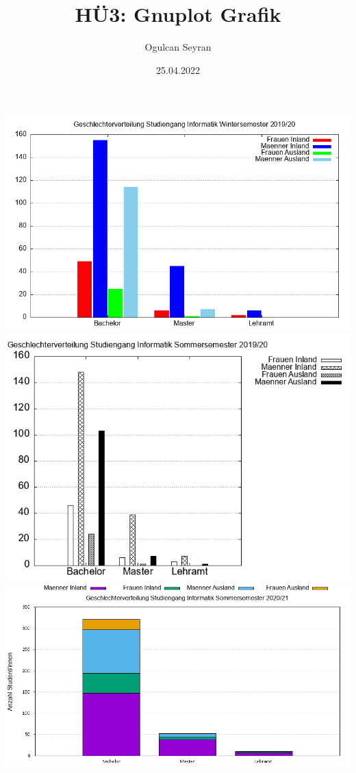 \documentclass{article}
\title{HÜ3: Gnuplot Grafik}
\author{Ogulcan Seyran}
\date{25.04.2022}
\begin{document}
	\maketitle
	\begin{center}
		\includegraphics[scale=0.50]{graph1.png}
		\includegraphics[scale=0.50]{graph2.png}
		\includegraphics[scale=0.50]{graph3.png}

\end{center}
\end{document}
